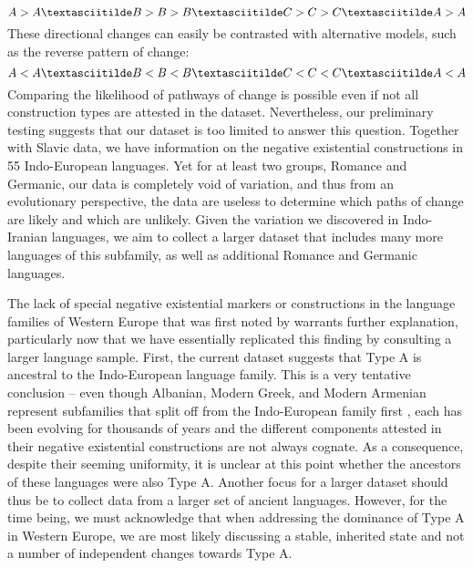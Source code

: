 \documentclass[output=paper]{langsci/langscibook}
\begin{document}
\begin{equation*}  
A > A{\textasciitilde}B > B > B{\textasciitilde}C > C > C{\textasciitilde}A > A
\end{equation*}
%
These directional changes can easily be contrasted with alternative models, such as the reverse pattern of change:
%
\begin{equation*}  
A < A{\textasciitilde}B < B < B{\textasciitilde}C < C < C{\textasciitilde}A < A
\end{equation*}
%
Comparing the likelihood of pathways of change is possible even if not all construction types are attested in the dataset. Nevertheless, our preliminary testing suggests that our dataset is too limited to answer this question. Together with  Slavic data, we have information on the negative existential constructions in 55 Indo-European languages. Yet for at least two groups, Romance and Germanic, our data is completely void of variation, and thus from an evolutionary perspective, the data are useless to determine which paths of change are likely and which are unlikely. Given the variation we discovered in Indo-Iranian languages, we aim to collect a larger dataset that includes many more languages of this subfamily, as well as additional Romance and Germanic languages. 

The lack of special negative existential markers or constructions in the
language families of Western Europe that was first noted by
\citet[117]{Veselinova2013} warrants further explanation, particularly now
that we have essentially replicated this finding by consulting a larger
language sample. First, the current dataset suggests that Type A is
ancestral to the Indo-European language family. This is a very tentative
conclusion – even though Albanian, Modern Greek, and Modern Armenian
represent subfamilies that split off from the Indo-European family first
\parencite[at least in][]{BouckaertLemey2012}, each has been evolving for
thousands of years and the different components attested in their negative
existential constructions are not always cognate. As a consequence, despite
their seeming uniformity, it is unclear at this point whether the ancestors
of these languages were also Type A. Another focus for a larger dataset
should thus be to collect data from a larger set of ancient languages.
However, for the time being, we must acknowledge that when addressing the
dominance of Type A in Western Europe, we are most likely discussing a
stable, inherited state \parencite[see][19]{Croft1991} and not a number of independent changes towards Type A. 
\end{document}
